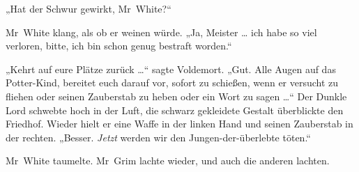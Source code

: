 „Hat der Schwur gewirkt, Mr~White?“

Mr~White klang, als ob er weinen würde.
„Ja, Meister … ich habe so viel verloren, bitte, ich bin schon genug bestraft worden.“

„Kehrt auf eure Plätze zurück …“ sagte Voldemort.
„Gut. Alle Augen auf das Potter-Kind, bereitet euch darauf vor, sofort zu schießen, wenn er versucht zu fliehen oder seinen Zauberstab zu heben oder ein Wort zu sagen …“
Der Dunkle Lord schwebte hoch in der Luft, die schwarz gekleidete Gestalt überblickte den Friedhof. Wieder hielt er eine Waffe in der linken Hand und seinen Zauberstab in der rechten.
„Besser. \emph{Jetzt} werden wir den Jungen-der-überlebte töten.“

Mr~White taumelte. Mr~Grim lachte wieder, und auch die anderen lachten.


